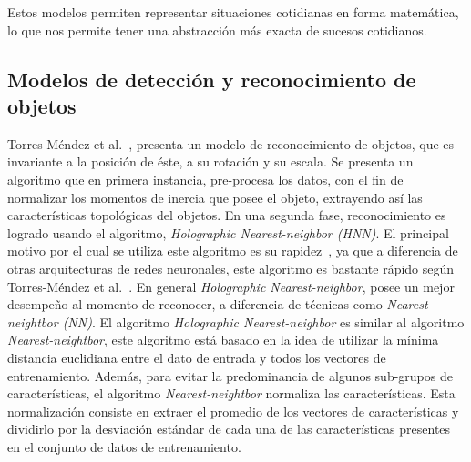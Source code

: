 \begin{definition}
Estos modelos permiten representar situaciones cotidianas en forma matemática, lo que nos permite tener una abstracción más exacta de sucesos cotidianos.
\end{definition}
 
\begin{definition}[Descriptor]

\end{definition}


\subsection{Modelos de detección y reconocimiento de objetos}
Torres-Méndez et al.~\cite{trsi2000}, presenta un modelo de reconocimiento de objetos, que es invariante a la posición de éste, a su rotación y su escala. Se presenta un algoritmo que en primera instancia, pre-procesa los datos, con el fin de normalizar los momentos de inercia que posee el objeto, extrayendo así las características topológicas del objetos. En una segunda fase, reconocimiento es logrado usando el algoritmo, \textit{Holographic Nearest-neighbor (HNN)}. El principal motivo por el cual se utiliza este algoritmo es su rapidez~\cite{trsi2000}, ya que a diferencia de otras arquitecturas de redes neuronales, este algoritmo es bastante rápido según Torres-Méndez et al.~\cite{trsi2000}. En general \textit{Holographic Nearest-neighbor}, posee un mejor desempeño al momento de reconocer, a diferencia de técnicas como \textit{Nearest-neightbor (NN)}. El algoritmo \textit{Holographic Nearest-neighbor} es similar al algoritmo \textit{Nearest-neightbor}, este algoritmo está basado en la idea de utilizar la mínima distancia euclidiana entre el dato de entrada y todos los vectores de entrenamiento. Además, para evitar la predominancia de algunos sub-grupos de características, el algoritmo \textit{Nearest-neightbor} normaliza las características. Esta normalización consiste en extraer el promedio de los vectores de características y dividirlo por la desviación estándar de cada una de las características presentes en el conjunto de datos de entrenamiento.

